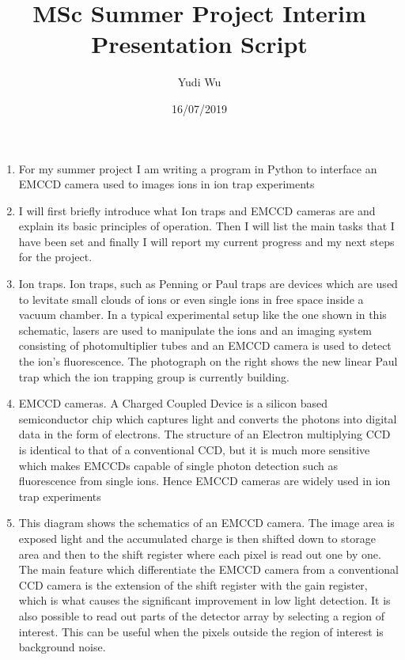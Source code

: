\documentclass[12pt]{article}
\title{MSc Summer Project Interim Presentation Script}
\author{Yudi Wu}
\date{16/07/2019}
\begin{document}
\maketitle


\begin{enumerate}
\item For my summer project I am writing a program in Python to interface an EMCCD camera used to images ions in ion trap experiments

\item I will first briefly introduce what Ion traps and EMCCD cameras are and explain its basic principles of operation. Then I will list the main tasks that I have been set and finally I will report my current progress and my next steps for the project.

\item Ion traps. Ion traps, such as Penning or Paul traps are devices which  are used to levitate small clouds of ions or even single ions in free space inside a vacuum chamber. In a typical experimental setup like the one shown in this schematic, lasers are used to manipulate the ions and an imaging system consisting of photomultiplier tubes and an EMCCD camera is used to detect the ion's fluorescence. The photograph on the right shows the new linear Paul trap which the ion trapping group is currently building.

\item EMCCD cameras. A Charged Coupled Device is a silicon based semiconductor chip which captures light and converts the photons into digital data in the form of electrons. The structure of an Electron multiplying CCD is identical to that of a conventional CCD, but it is much more sensitive which makes EMCCDs capable of single photon detection such as fluorescence from single ions. Hence EMCCD cameras are widely used in ion trap experiments

\item This diagram shows the schematics of an EMCCD camera. The image area is exposed light and the accumulated charge is then shifted down to storage area and then to the shift register where each pixel is read out one by one. The main feature which differentiate the EMCCD camera from a conventional CCD camera is the extension of the shift register with the gain register, which is what causes the significant improvement in low light detection. It is also possible to read out parts of the detector array by selecting a region of interest. This can be useful when the pixels outside the region of interest is background noise.


\end{enumerate}
\end{document}
